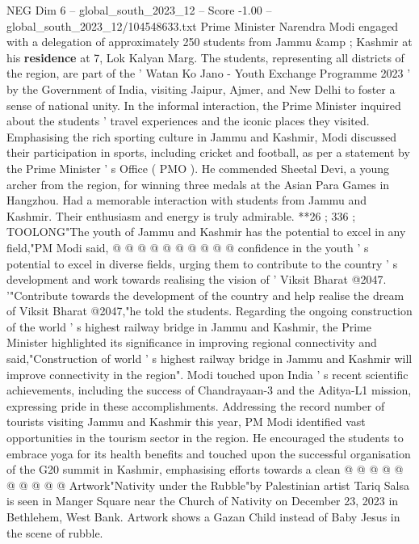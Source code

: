 \begin{textsample}{NEG Dim 6 – global\_south\_2023\_12 – Score -1.00 – global\_south\_2023\_12/104548633.txt}  \label{ex:f6_neg_352}
Prime Minister Narendra Modi engaged with a delegation of approximately 250 students from Jammu \&amp ; Kashmir at his \textbf{residence} at 7, Lok Kalyan Marg.
The students, representing all districts of the region, are part of the ' Watan Ko Jano - Youth Exchange Programme 2023 ' by the Government of India, visiting Jaipur, Ajmer, and New Delhi to foster a sense of national unity.
In the informal interaction, the Prime Minister inquired about the students ' travel experiences and the iconic places they visited.
Emphasising the rich sporting culture in Jammu and Kashmir, Modi discussed their participation in sports, including cricket and football, as per a statement by the Prime Minister ' s Office ( PMO ).
He commended Sheetal Devi, a young archer from the region, for winning three medals at the Asian Para Games in Hangzhou.
Had a memorable interaction with students from Jammu and Kashmir.
Their enthusiasm and energy is truly admirable. **26 ; 336 ; TOOLONG"The youth of Jammu and Kashmir has the potential to excel in any field,"PM Modi said, @ @ @ @ @ @ @ @ @ @ confidence in the youth ' s potential to excel in diverse fields, urging them to contribute to the country ' s development and work towards realising the vision of ' Viksit Bharat @2047. '"Contribute towards the development of the country and help realise the dream of Viksit Bharat @2047,"he told the students.
Regarding the ongoing construction of the world ' s highest railway bridge in Jammu and Kashmir, the Prime Minister highlighted its significance in improving regional connectivity and said,"Construction of world ' s highest railway bridge in Jammu and Kashmir will improve connectivity in the region".
Modi touched upon India ' s recent scientific achievements, including the success of Chandrayaan-3 and the Aditya-L1 mission, expressing pride in these accomplishments.
Addressing the record number of tourists visiting Jammu and Kashmir this year, PM Modi identified vast opportunities in the tourism sector in the region.
He encouraged the students to embrace yoga for its health benefits and touched upon the successful organisation of the G20 summit in Kashmir, emphasising efforts towards a clean @ @ @ @ @ @ @ @ @ @ Artwork"Nativity under the Rubble"by Palestinian artist Tariq Salsa is seen in Manger Square near the Church of Nativity on December 23, 2023 in Bethlehem, West Bank.
Artwork shows a Gazan Child instead of Baby Jesus in the scene of rubble.

\end{textsample}
